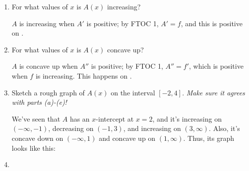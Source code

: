 \documentclass{article}
\begin{document}
\begin{enumerate}[topsep=0pt]
\begin{enumerate}
  \item
    \begin{problem}[\vfill]
      For what values of $x$ is $A(x)$ increasing?  
    \end{problem}

    \begin{solution} %
      $A$ is increasing when $A'$ is positive; by FTOC 1, $A' =
      f$, and this is positive on .
    \end{solution}

  \item
    \begin{problem}[\vfill]
      For what values of $x$ is $A(x)$ concave up?
    \end{problem}

    \begin{solution} %
      $A$ is concave up when $A''$ is positive; by FTOC 1, $A'' =
      f'$, which is positive when $f$ is increasing. This happens on
      .
    \end{solution}

  \item
    \begin{problem}[\nstretch{2}]
      Sketch a rough graph of $A(x)$ on the interval $[-2, 4]$. 
      \emph{Make sure it agrees with parts (a)-(e)!}
    \end{problem}

    \begin{solution} %
      We've seen that $A$ has an $x$-intercept at $x = 2$, and it's
      increasing on $(-\infty, -1)$, decreasing on $(-1, 3)$, and
      increasing on $(3, \infty)$.  Also, it's concave down on $(-\infty,
      1)$ and concave up on $(1, \infty)$.  Thus, its graph looks like
      this:     
      \begin{center}
      \end{center}
    \end{solution}

  \item
    \begin{problem}[\stretch{2}]


\end{problem}
\end{enumerate}
\end{enumerate}
\end{document}
